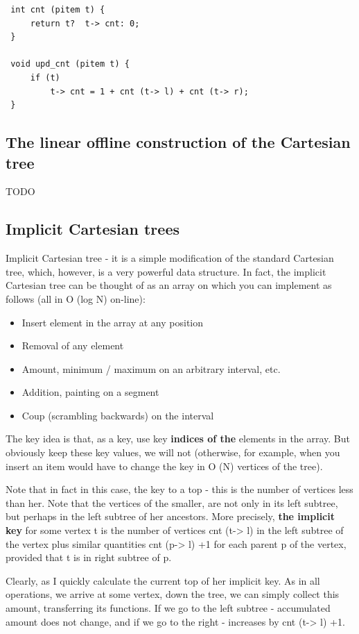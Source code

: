 \begin{verbatim}
 int cnt (pitem t) {
     return t?  t-> cnt: 0;
 }

 void upd_cnt (pitem t) {
     if (t)
         t-> cnt = 1 + cnt (t-> l) + cnt (t-> r);
 } 
\end{verbatim}\subsection{ The linear offline construction of the Cartesian tree }
TODO

\subsection{ Implicit Cartesian trees }
Implicit Cartesian tree - it is a simple modification of the standard Cartesian tree, which, however, is a very powerful data structure. In fact, the implicit Cartesian tree can be thought of as an array on which you can implement as follows (all in O (log N) on-line):

\begin{itemize}
\item Insert element in the array at any position
\item Removal of any element
\item Amount, minimum / maximum on an arbitrary interval, etc.
\item Addition, painting on a segment
\item Coup (scrambling backwards) on the interval
\end{itemize}

The key idea is that, as a key, use key \textbf{indices of the} elements in the array. But obviously keep these key values, we will not (otherwise, for example, when you insert an item would have to change the key in O (N) vertices of the tree).

Note that in fact in this case, the key to a top - this is the number of vertices less than her. Note that the vertices of the smaller, are not only in its left subtree, but perhaps in the left subtree of her ancestors. More precisely, \textbf{the implicit key} for some vertex t is the number of vertices cnt (t-> l) in the left subtree of the vertex plus similar quantities cnt (p-> l) +1 for each parent p of the vertex, provided that t is in right subtree of p.

Clearly, as I quickly calculate the current top of her implicit key. As in all operations, we arrive at some vertex, down the tree, we can simply collect this amount, transferring its functions. If we go to the left subtree - accumulated amount does not change, and if we go to the right - increases by cnt (t-> l) +1.

